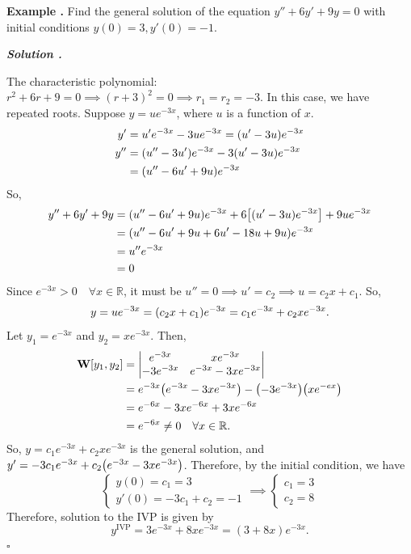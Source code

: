 \documentclass[12pt, a4paper]{article}
\newcounter{index}[subsection]
\newenvironment*{eg}{\begin{framed}\par\noindent\textbf{Example \thesubsection.\stepcounter{index}\theindex}}{\par\end{framed}}
\newcounter{nprf}[subsection]
\newenvironment*{sol}{\par\indent\textbf{\textit{Solution \stepcounter{nprf}\thenprf.}}\par}{\hfill{$\square$}\par}
\def\R{{\mathbb{R}}}
\def\W{\vb W}
\begin{document}
\begin{eg}
	Find the general solution of the equation $y''+6y'+9y=0$ with initial conditions $y(0)=3,y'(0)=-1$.
	\begin{sol}
		The characteristic polynomial: $r^2+6r+9=0\implies(r+3)^2=0\implies r_1=r_2=-3$. In this case, we have repeated roots. Suppose $y=ue^{-3x}$, where $u$ is a function of $x$. \begin{align*}y'&=u'e^{-3x}-3ue^{-3x}=(u'-3u)e^{-3x}\\y''&=\qty(u''-3u')e^{-3x}-3\qty(u'-3u)e^{-3x}\\&=\qty(u''-6u'+9u)e^{-3x}\end{align*} So, \begin{align*}y''+6y'+9y&=\qty(u''-6u'+9u)e^{-3x}+6\qty[\qty(u'-3u)e^{-3x}]+9ue^{-3x}\\&=\qty(u''-6u'+9u+6u'-18u+9u)e^{-3x}\\&=u''e^{-3x}\\&=0\end{align*} Since $e^{-3x}>0\quad\forall x\in\R$, it must be $u''=0\implies u'=c_2\implies u=c_2x+c_1$. So, \[y=ue^{-3x}=\qty(c_2x+c_1)e^{-3x}=c_1e^{-3x}+c_2xe^{-3x}.\] Let $y_1=e^{-3x}$ and $y_2=xe^{-3x}$. Then, \begin{align*}\W\qty[y_1,y_2]&=\mqty|e^{-3x}&xe^{-3x}\\-3e^{-3x}&e^{-3x}-3xe^{-3x}|\\&=e^{-3x}\qty(e^{-3x}-3xe^{-3x})-\qty(-3e^{-3x})\qty(xe^{-ex})\\&=e^{-6x}-3xe^{-6x}+3xe^{-6x}\\&=e^{-6x}\neq0\quad\forall x\in\R.\end{align*} So, $y=c_1e^{-3x}+c_2xe^{-3x}$ is the general solution, and $y'=-3c_1e^{-3x}+c_2\qty(e^{-3x}-3xe^{-3x})$. Therefore, by the initial condition, we have \[\begin{cases}y(0)=c_1=3\\y'(0)=-3c_1+c_2=-1\end{cases}\implies\begin{cases}c_1=3\\c_2=8\end{cases}\] Therefore, solution to the IVP is given by \[y^\text{IVP}=3e^{-3x}+8xe^{-3x}=(3+8x)e^{-3x}.\]
	\end{sol}
\end{eg}
\end{document}
